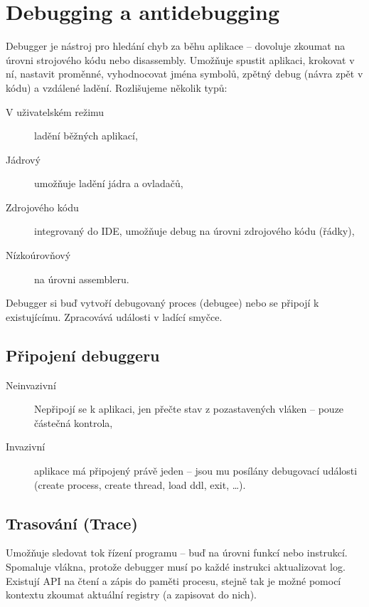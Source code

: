 \section{Debugging a antidebugging}

Debugger je nástroj pro hledání chyb za běhu aplikace -- dovoluje zkoumat na úrovni strojového kódu nebo disassembly.
Umožňuje spustit aplikaci, krokovat v ní, nastavit proměnné, vyhodnocovat jména symbolů, zpětný debug (návra zpět v kódu) a vzdálené ladění.
Rozlišujeme několik typů:

\begin{description}
    \item[V uživatelském režimu] ladění běžných aplikací,
    \item[Jádrový] umožňuje ladění jádra a ovladačů,
    \item[Zdrojového kódu] integrovaný do IDE, umožňuje debug na úrovni zdrojového kódu (řádky),
    \item[Nízkoúrovňový] na úrovni assembleru.
\end{description}

Debugger si buď vytvoří debugovaný proces (debugee) nebo se připojí k existujícímu.
Zpracovává události v ladící smyčce.

\subsection*{Připojení debuggeru}

\begin{description}
    \item[Neinvazivní] Nepřipojí se k aplikaci, jen přečte stav z pozastavených vláken -- pouze částečná kontrola,
    \item[Invazivní] aplikace má připojený právě jeden -- jsou mu posílány debugovací události (create process, create thread, load ddl, exit, \dots).
\end{description}

\subsection*{Trasování (Trace)}

Umožňuje sledovat tok řízení programu -- buď na úrovni funkcí nebo instrukcí.
Spomaluje vlákna, protože debugger musí po každé instrukci aktualizovat log.
Existují API na čtení a zápis do paměti procesu, stejně tak je možné pomocí kontextu zkoumat aktuální registry (a zapisovat do nich).

